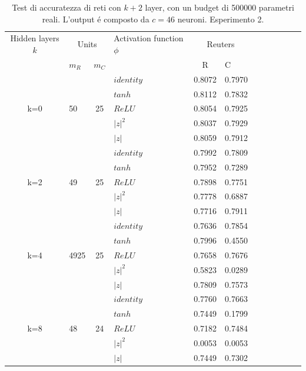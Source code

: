 \documentclass[a4paper,10pt]{article}
\begin{document}
 \begin{table}
  \centering
  \begin{tabular}{cp{} cp{} cp{}   cp{} cp{} cp{}}
   \cline{1-6}
   Hidden layers $k$ & \multicolumn{2}{c}{Units} $p_R$ & Activation function $\phi$ & \multicolumn{2}{c}{Reuters}\\
   \cline{2-3} \cline{5-6}
   & $m_R$ & $m_C$ & & R & C \\
   \cline{1-6}
   & & & $identity$ & 0.8072 & 0.7970 \\
   \cline{4-6}
   & & & $tanh$ & 0.8112 & 0.7832 \\
   \cline{4-6}
   k=0 & 50 & 25 & $ReLU$ & 0.8054 & 0.7925 \\
   \cline{4-6}
   & & & $|z|^2$ & 0.8037 & 0.7929 \\
   \cline{4-6}
   & & & $|z|$ & 0.8059 & 0.7912 \\
   \cline{1-6}
   
   \cline{1-6}
   & & & $identity$ & 0.7992 & 0.7809 \\
   \cline{4-6}
   & & & $tanh$ & 0.7952 & 0.7289 \\
   \cline{4-6}
   k=2 & 49 & 25 & $ReLU$ & 0.7898 & 0.7751 \\
   \cline{4-6}
   & & & $|z|^2$ & 0.7778 & 0.6887 \\
   \cline{4-6}
   & & & $|z|$ & 0.7716 & 0.7911 \\
   \cline{1-6}
   
   \cline{1-6}
   & & & $identity$ & 0.7636 & 0.7854 \\
   \cline{4-6}
   & & & $tanh$ & 0.7996 & 0.4550 \\
   \cline{4-6}
   k=4 & 4925 & 25 & $ReLU$ & 0.7658 & 0.7676 \\
   \cline{4-6}
   & & & $|z|^2$ & 0.5823 & 0.0289 \\
   \cline{4-6}
   & & & $|z|$ & 0.7809 & 0.7573 \\
   \cline{1-6}
   
   \cline{1-6}
   & & & $identity$ & 0.7760 & 0.7663 \\
   \cline{4-6}
   & & & $tanh$ & 0.7449 & 0.1799 \\
   \cline{4-6}
   k=8 & 48 & 24 & $ReLU$ & 0.7182 & 0.7484 \\
   \cline{4-6}
   & & & $|z|^2$ & 0.0053 & 0.0053 \\
   \cline{4-6}
   & & & $|z|$ & 0.7449 & 0.7302 \\
   \cline{1-6}
      
  \end{tabular}
  \caption{Test di accuratezza di reti con $k+2$ layer, con un budget di 500000 parametri reali. L'output \'e composto da $c=46$ neuroni. Esperimento 2.}
  \label{Reuters2Tab}
 \end{table}
 
\end{document}
